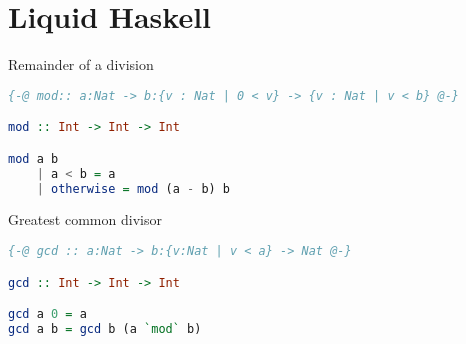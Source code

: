 \section{Liquid Haskell}

\begin{frame}[containsverbatim]{Remainder of a division}
\begin{lstlisting}[language=Haskell, basicstyle=\small]
{-@ mod:: a:Nat -> b:{v : Nat | 0 < v} -> {v : Nat | v < b} @-}

mod :: Int -> Int -> Int

mod a b
    | a < b = a
    | otherwise = mod (a - b) b
\end{lstlisting}

\end{frame}


\begin{frame}[containsverbatim]{Greatest common divisor}
\begin{lstlisting}[language=Haskell, basicstyle=\small]
{-@ gcd :: a:Nat -> b:{v:Nat | v < a} -> Nat @-}

gcd :: Int -> Int -> Int

gcd a 0 = a
gcd a b = gcd b (a `mod` b)
\end{lstlisting}
\end{frame}

